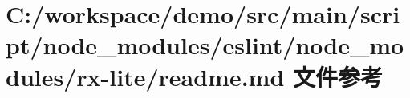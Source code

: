 \hypertarget{node__modules_2eslint_2node__modules_2rx-lite_2_r_e_a_d_m_e_8md}{}\section{C\+:/workspace/demo/src/main/script/node\+\_\+modules/eslint/node\+\_\+modules/rx-\/lite/readme.md 文件参考}
\label{node__modules_2eslint_2node__modules_2rx-lite_2_r_e_a_d_m_e_8md}
